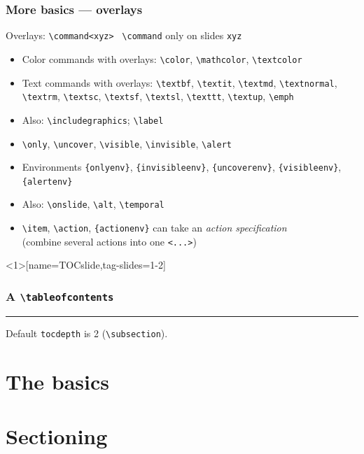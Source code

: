 \documentclass{ltx-talk}
\newcommand{\cs}[1]{\texttt{\textbackslash #1}}
\newcommand{\tubbraced}[1]{\texttt{\{#1\}}}
\begin{document}
\begin{frame*}
\frametitle{More basics --- overlays}
Overlays: \verb|\command<xyz>| \textrightarrow\ \cs{command}
only on slides \verb|xyz|\bigskip
\begin{itemize}
\item Color commands with overlays: \cs{color}, \cs{mathcolor}, \cs{textcolor}
\item Text commands with overlays: \cs{textbf}, \cs{textit},
\cs{textmd}, \cs{textnormal}, \cs{textrm}, \cs{textsc}, \cs{textsf}, \cs{textsl}, \cs{texttt}, \cs{textup},
\cs{emph}
\item Also: \cs{includegraphics}; \cs{label}
\item[\Large\star] \cs{only}, \cs{uncover}, \cs{visible}, \cs{invisible},
\cs{alert}
\item Environments \tubbraced{onlyenv}, \tubbraced{invisibleenv},
\tubbraced{uncoverenv}, \tubbraced{visibleenv}, \tubbraced{alertenv}
\item Also: \cs{onslide}, \cs{alt}, \cs{temporal}
\item \cs{item}, \cs{action}, \tubbraced{actionenv} can take an
\emph{action specification}\\
(combine several \textcolor{structure}{\Large\star} actions
into one \verb|<...>|)
\end{itemize}
\end{frame*}

\begin{frame}<1>[name=TOCslide,tag-slides=1-2]
\frametitle{A \cs{tableofcontents}\only<2>{ in a \cs{section}}}
\tableofcontents
\hrule\bigskip
Default \texttt{tocdepth} is 2 (\cs{subsection}).
\end{frame}

\section{The basics}

\section{Sectioning}
\end{document}
